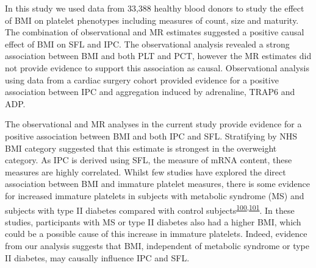 \documentclass[11pt,twoside]{bristolthesis}
\begin{document}
In this study we used data from 33,388 healthy blood donors to study the effect of BMI on platelet phenotypes including measures of count, size and maturity. The combination of observational and MR estimates suggested a positive causal effect of BMI on SFL and IPC. The observational analysis revealed a strong association between BMI and both PLT and PCT, however the MR estimates did not provide evidence to support this association as causal. Observational analysis using data from a cardiac surgery cohort provided evidence for a positive association between IPC and aggregation induced by adrenaline, TRAP6 and ADP.

The observational and MR analyses in the current study provide evidence for a positive association between BMI and both IPC and SFL. Stratifying by NHS BMI category suggested that this estimate is strongest in the overweight category. As IPC is derived using SFL, the measure of mRNA content, these measures are highly correlated. Whilst few studies have explored the direct association between BMI and immature platelet measures, there is some evidence for increased immature platelets in subjects with metabolic syndrome (MS) and subjects with type II diabetes compared with control subjects\textsuperscript{\protect\hyperlink{ref-Vaduganathan2008a}{100},\protect\hyperlink{ref-Mijovic2015a}{101}}. In these studies, participants with MS or type II diabetes also had a higher BMI, which could be a possible cause of this increase in immature platelets. Indeed, evidence from our analysis suggests that BMI, independent of metabolic syndrome or type II diabetes, may causally influence IPC and SFL.
\end{document}
